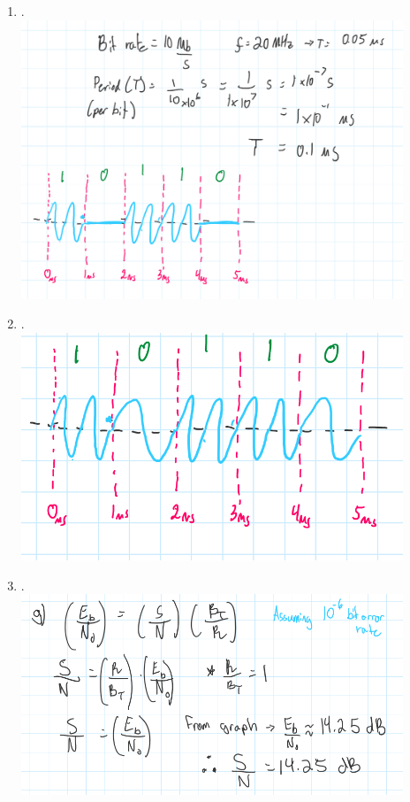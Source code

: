 \documentclass[11pt]{article}
\begin{document}
\begin{enumerate}[label=(\alph*)]
\item . \\
\includegraphics[width=0.9\textwidth]{1e}
\item . \\
\includegraphics[width=0.9\textwidth]{1f} \\
\item .\\
\includegraphics[width=0.9\textwidth]{1g} \\


\end{enumerate}
\end{document}
